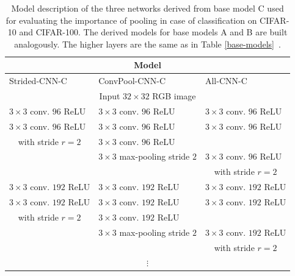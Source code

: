 \documentclass{article} %
\begin{document}
\begin{table}[h]
\caption{Model description of the three networks derived from base model C used for evaluating the importance of pooling in case of classification on CIFAR-10 and CIFAR-100. The derived models for base models A and B are built analogously. The higher layers are the same as in Table \ref{base-models}~.}
\label{derived-models}
\begin{center}
\begin{small}
\begin{tabular}{l|l|l}
\multicolumn{3}{c}{\bf Model} \\
\hline
Strided-CNN-C         &  ConvPool-CNN-C & All-CNN-C \\
\hline
\multicolumn{3}{c}{Input $32 \times 32$ RGB image} \\
\hline
$3 \times 3$ conv. $96$ ReLU  & $3 \times 3$ conv. $96$ ReLU  & $3 \times 3$ conv. $96$ ReLU  \\
$3 \times 3$ conv. $96$ ReLU  & $3 \times 3$ conv. $96$ ReLU  & $3 \times 3$ conv. $96$ ReLU  \\
\multicolumn{1}{c|}{with stride $r = 2$}    & $3 \times 3$ conv. $96$ ReLU  &  \\
\hline 
                                   & $3 \times 3$ max-pooling stride $2$ & $3 \times 3$ conv. $96$ ReLU  \\
                                   &                                     & \multicolumn{1}{c}{with stride $r = 2$} \\
\hline
$3 \times 3$ conv. $192$ ReLU & $3 \times 3$ conv. $192$ ReLU & $3 \times 3$ conv. $192$ ReLU \\
$3 \times 3$ conv. $192$ ReLU & $3 \times 3$ conv. $192$ ReLU  & $3 \times 3$ conv. $192$ ReLU \\
\multicolumn{1}{c|}{with stride $r = 2$}    & $3 \times 3$ conv. $192$ ReLU &  \\
\hline
                                   & $3 \times 3$ max-pooling stride $2$ & $3 \times 3$ conv. $192$ ReLU \\
                                   &                                     & \multicolumn{1}{c}{with stride $r = 2$} \\
\hline
\multicolumn{3}{c}{$\vdots$} \\
\end{tabular}
\end{small}
\end{center}
\end{table}
\end{document}
